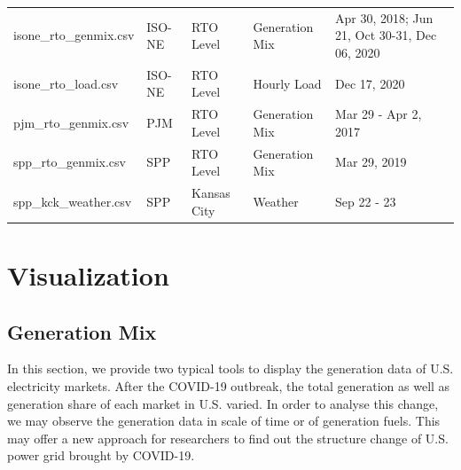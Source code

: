 \documentclass[11pt]{article}
\numberwithin{equation}{section}
\numberwithin{table}{section}
\numberwithin{figure}{section}
\begin{document}
\begin{table}[htbp]
\begin{tabular}{llllp{}}
	isone\_rto\_genmix.csv                    & ISO-NE                              & RTO Level                         & Generation Mix                        & Apr 30, 2018; Jun 21, Oct 30-31, Dec 06, 2020                                                                                \\
	isone\_rto\_load.csv                      & ISO-NE                              & RTO Level                         & Hourly Load                           & Dec 17, 2020                                                                                                                 \\
	pjm\_rto\_genmix.csv                      & PJM                                 & RTO Level                         & Generation Mix                        & Mar 29 - Apr 2, 2017                                                                                                         \\
	spp\_rto\_genmix.csv                      & SPP                                 & RTO Level                         & Generation Mix                        & Mar 29, 2019                                                                                                                 \\
	spp\_kck\_weather.csv                     & SPP                                 & Kansas City                       & Weather                               & Sep 22 - 23                \\                                                                                                 
	\bottomrule
	\end{tabular}
	\end{table}









\newpage
\section{Visualization} \label{sec:visual}

\subsection{Generation Mix}

In this section, we provide two typical tools to display the generation data of U.S. electricity markets. After the COVID-19 outbreak, the total generation as well as generation share of each market in U.S. varied. In order to analyse this change, we may observe the generation data in scale of time or of generation fuels. This may offer a new approach for researchers to find out the structure change of U.S. power grid brought by COVID-19.
\end{document}
